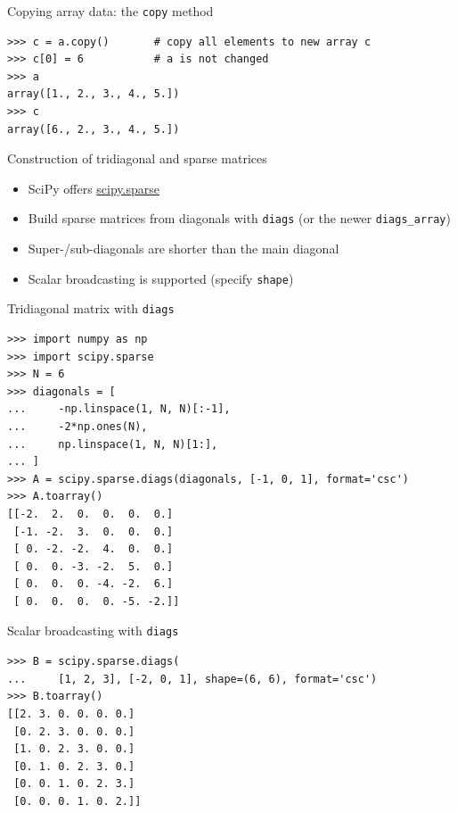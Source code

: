 \begin{frame}[fragile]{Copying array data: the \texttt{copy} method}
\begin{lstlisting}[style=pythonTiny]
>>> c = a.copy()       # copy all elements to new array c
>>> c[0] = 6           # a is not changed
>>> a
array([1., 2., 3., 4., 5.])
>>> c
array([6., 2., 3., 4., 5.])
\end{lstlisting}
\end{frame}

\begin{frame}{Construction of tridiagonal and sparse matrices}
  \begin{itemize}
    \item SciPy offers
          \href{https://docs.scipy.org/doc/scipy/reference/sparse.html}{scipy.sparse}
    \item Build sparse matrices from diagonals with \texttt{diags}
          (or the newer \texttt{diags\_array})
    \item Super-/sub-diagonals are shorter than the main diagonal
    \item Scalar broadcasting is supported (specify \texttt{shape})
  \end{itemize}
\end{frame}

\begin{frame}[fragile]{Tridiagonal matrix with \texttt{diags}}
\begin{lstlisting}[style=pythonTiny]
>>> import numpy as np
>>> import scipy.sparse
>>> N = 6
>>> diagonals = [
...     -np.linspace(1, N, N)[:-1],
...     -2*np.ones(N),
...     np.linspace(1, N, N)[1:],
... ]
>>> A = scipy.sparse.diags(diagonals, [-1, 0, 1], format='csc')
>>> A.toarray()
[[-2.  2.  0.  0.  0.  0.]
 [-1. -2.  3.  0.  0.  0.]
 [ 0. -2. -2.  4.  0.  0.]
 [ 0.  0. -3. -2.  5.  0.]
 [ 0.  0.  0. -4. -2.  6.]
 [ 0.  0.  0.  0. -5. -2.]]
\end{lstlisting}
\end{frame}

\begin{frame}[fragile]{Scalar broadcasting with \texttt{diags}}
\begin{lstlisting}[style=pythonTiny]
>>> B = scipy.sparse.diags(
...     [1, 2, 3], [-2, 0, 1], shape=(6, 6), format='csc')
>>> B.toarray()
[[2. 3. 0. 0. 0. 0.]
 [0. 2. 3. 0. 0. 0.]
 [1. 0. 2. 3. 0. 0.]
 [0. 1. 0. 2. 3. 0.]
 [0. 0. 1. 0. 2. 3.]
 [0. 0. 0. 1. 0. 2.]]
\end{lstlisting}
\end{frame}

